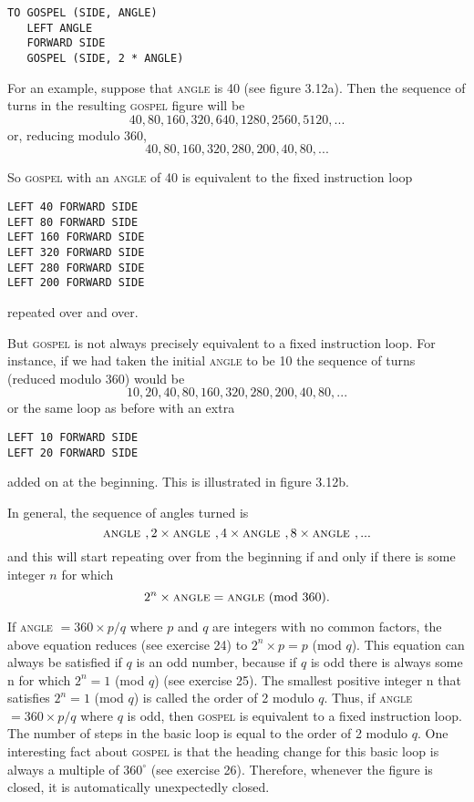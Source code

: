 \documentclass{book}
\begin{document}
\begin{verbatim}
TO GOSPEL (SIDE, ANGLE)
   LEFT ANGLE
   FORWARD SIDE
   GOSPEL (SIDE, 2 * ANGLE)
\end{verbatim}
For an example, suppose that \textsc{angle} is 40 (see figure 3.12a). Then the
sequence of turns in the resulting \textsc{gospel} figure will be $$40, 80, 160, 320, 640, 1280, 2560, 5120,...$$ or, reducing modulo 360, $$40, 80, 160, 320, 280, 200, 40, 80,...$$

So \textsc{gospel} with an \textsc{angle} of 40 is equivalent to the fixed instruction loop

\begin{verbatim}
LEFT 40 FORWARD SIDE
LEFT 80 FORWARD SIDE
LEFT 160 FORWARD SIDE
LEFT 320 FORWARD SIDE
LEFT 280 FORWARD SIDE
LEFT 200 FORWARD SIDE
\end{verbatim}
repeated over and over.

But \textsc{gospel} is not always precisely equivalent to a fixed instruction
loop. For instance, if we had taken the initial \textsc{angle} to be 10 the sequence
of turns (reduced modulo 360) would be $$10, 20, 40, 80, 160, 320, 280, 200, 40, 80,...$$ or the same loop as before with an extra

\begin{verbatim}
LEFT 10 FORWARD SIDE
LEFT 20 FORWARD SIDE
\end{verbatim}
added on at the beginning. This is illustrated in figure 3.12b.

In general, the sequence of angles turned is $$\text{\textsc{angle }}, 2 \times \text{\textsc{angle }}, 4 \times \text{\textsc{angle }}, 8 \times \text{\textsc{angle }}, ...$$ and this will start repeating over from the beginning if and only if there
is some integer $n$ for which
$$2^n \times \text{\textsc{angle}} = \text{\textsc{angle} (mod 360).}$$

If \textsc{angle} $= 360 \times p/q$ where $p$ and $q$ are integers with no common
factors, the above equation reduces (see exercise 24) to $2^n \times p = p$
(mod $q$). This equation can always be satisfied if $q$ is an odd number,
because if $q$ is odd there is always some n for which $2^n = 1$ (mod $q$)
(see exercise 25). The smallest positive integer n that satisfies $2^n = 1$
(mod $q$) is called the order of 2 modulo $q$. Thus,
if \textsc{angle} $= 360 \times p/q$ where $q$ is odd, then \textsc{gospel} is equivalent to a
fixed instruction loop. The number of steps in the basic loop is equal to
the order of 2 modulo $q$.
One interesting fact about \textsc{gospel} is that the heading change for this
basic loop is always a multiple of $360^{\circ}$ (see exercise 26). Therefore,
whenever the figure is closed, it is automatically unexpectedly closed.
\end{document}

